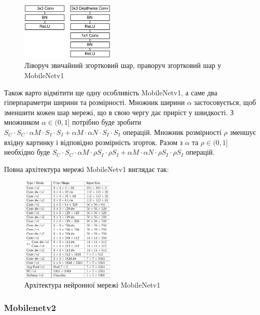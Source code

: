 \begin{figure}[H]
    \centering
    \includegraphics[width=0.4\textwidth]{images/cnn_mobilenetv1_conv_layer}
    \caption{Ліворуч звичайний згортковий шар,
        праворуч згортковий шар у MobileNetv1  \cite{mobilenetv1}
        \label{fig:cnn:mobilenetv1_conv_layer}
    }
\end{figure}

Також варто відмітити ще одну особливість MobileNetv1, а саме два гіперпараметри
ширини та розмірності.
Множник ширини $\alpha$ застосовується, щоб зменшити кожен шар мережі, що
в свою чергу дає приріст у швидкості.
З множником  $\alpha \in (0,1]$ потрібно буде зробити
$S_C · S_C · \alpha M · S_I · S_I + \alpha M · \alpha N · S_I · S_I$ операцій.
Множник розмірності $\rho$ зменшує вхідну картинку і відповідно
розмірність згорток. Разом з $\alpha$  та $\rho \in (0,1]$ необхідно буде
$S_C · S_C · \alpha M · \rho S_I · \rho S_I + \alpha M ·\alpha  N · \rho S_I · \rho S_I$
операцій.

Повна архітектура мережі MobileNetv1 виглядає так:

\begin{figure}[H]
    \centering
    \includegraphics[width=0.4\textwidth]{images/cnn_mobilenetv1_architecture}
    \caption{Архітектура нейронної мережі MobileNetv1   \cite{mobilenetv1}
        \label{fig:cnn:mobilenetv1_architecture}
    }
\end{figure}


\subsubsection{Mobilenetv2}

